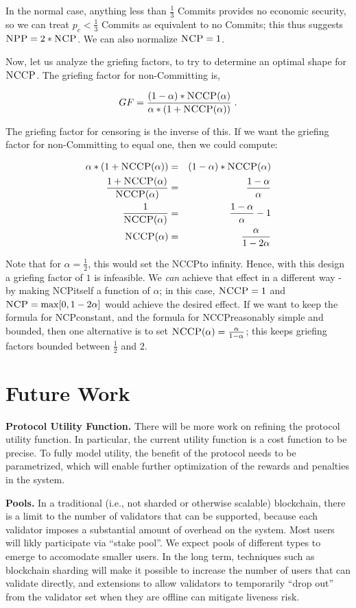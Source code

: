 \documentclass[12pt, final]{article}
\newcommand{\NCP}{\textsc{NCP}\space}
\newcommand{\NCCP}{\textsc{NCCP}\space}
\newcommand{\NPP}{\textsc{NPP}\space}
\begin{document}
In the normal case, anything less than $\frac{1}{3}$ Commits provides no economic security, so we can treat $p_c < \frac{1}{3}$ Commits as equivalent to no Commits; this thus suggests $\NPP = 2 * \NCP$. We can also normalize $\NCP = 1$.

Now, let us analyze the griefing factors, to try to determine an optimal shape for $\NCCP$. The griefing factor for non-Committing is,

\begin{equation}
GF = \frac{(1-\alpha) * \NCCP(\alpha)}{\alpha * (1 + \NCCP(\alpha))} \; .
\end{equation}

The griefing factor for censoring is the inverse of this. If we want the griefing factor for non-Committing to equal one, then we could compute:

\begin{eqnarray}
\alpha * (1 + \NCCP(\alpha)) &=& (1-\alpha) * \NCCP(\alpha) \\
\frac{1 + \NCCP(\alpha)}{\NCCP(\alpha)} &=& \frac{1-\alpha}{\alpha} \\
\frac{1}{\NCCP(\alpha)} &=& \frac{1-\alpha}{\alpha} - 1 \\
\NCCP(\alpha) &=& \frac{\alpha}{1-2\alpha}
\end{eqnarray}

Note that for $\alpha = \frac{1}{2}$, this would set the \NCCP to infinity. Hence, with this design a griefing factor of $1$ is infeasible. We \emph{can} achieve that effect in a different way - by making \NCP itself a function of $\alpha$; in this case, $\NCCP = 1$ and $\NCP = \max[0, 1 - 2\alpha]$ would achieve the desired effect. If we want to keep the formula for \NCP constant, and the formula for \NCCP reasonably simple and bounded, then one alternative is to set $\NCCP(\alpha) = \frac{\alpha}{1-\alpha}$; this keeps griefing factors bounded between $\frac{1}{2}$ and $2$.

\section{Future Work}
\textbf{Protocol Utility Function.} There will be more work on refining the protocol utility function. In particular, the current utility function is a cost function to be precise. To fully model utility, the benefit of the protocol needs to be parametrized, which will enable further optimization of the rewards and penalties in the system.

\textbf{Pools.} In a traditional (i.e., not sharded or otherwise scalable) blockchain, there is a limit to the number of validators that can be supported, because each validator imposes a substantial amount of overhead on the system. Most users will likly participate via ``stake pool''. We expect pools of different types to emerge to accomodate smaller users. In the long term, techniques such as blockchain sharding will make it possible to increase the number of users that can validate directly, and extensions to allow validators to temporarily ``drop out'' from the validator set when they are offline can mitigate liveness risk.
\end{document}
